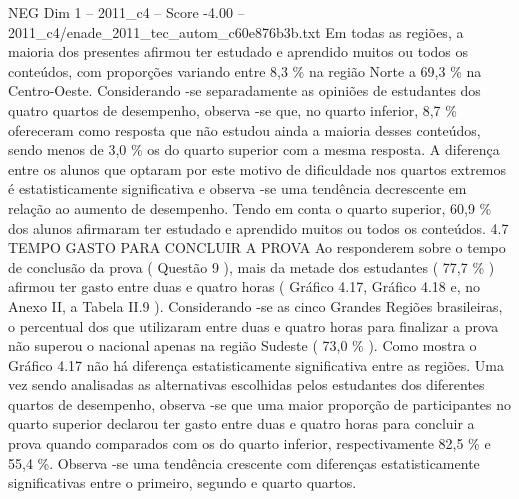 \begin{textsample}{NEG Dim 1 – 2011\_c4 – Score -4.00 – 2011\_c4/enade\_2011\_tec\_autom\_c60e876b3b.txt}
Em todas as regiões, a maioria dos presentes afirmou ter estudado e aprendido muitos ou todos os conteúdos, com proporções variando entre 8,3 \% na região Norte a 69,3 \% na Centro-Oeste.
Considerando -se separadamente as opiniões de estudantes dos quatro quartos de desempenho, observa -se que, no quarto inferior, 8,7 \% ofereceram como resposta que não estudou ainda a maioria desses conteúdos, sendo menos de 3,0 \% os do quarto superior com a mesma resposta.
A diferença entre os alunos que optaram por este motivo de dificuldade nos quartos extremos é estatisticamente significativa e observa -se uma tendência decrescente em relação ao aumento de desempenho.
Tendo em conta o quarto superior, 60,9 \% dos alunos afirmaram ter estudado e aprendido muitos ou todos os conteúdos. 4.7 TEMPO GASTO PARA CONCLUIR A PROVA Ao responderem sobre o tempo de conclusão da prova ( Questão 9 ), mais da metade dos estudantes ( 77,7 \% ) afirmou ter gasto entre duas e quatro horas ( Gráfico 4.17, Gráfico 4.18 e, no Anexo II, a Tabela II.9 ).
Considerando -se as cinco Grandes Regiões brasileiras, o percentual dos que utilizaram entre duas e quatro horas para finalizar a prova não superou o nacional apenas na região Sudeste ( 73,0 \% ).
Como mostra o Gráfico 4.17 não há diferença estatisticamente significativa entre as regiões.
Uma vez sendo analisadas as alternativas escolhidas pelos estudantes dos diferentes quartos de desempenho, observa -se que uma maior proporção de participantes no quarto superior declarou ter gasto entre duas e quatro horas para concluir a prova quando comparados com os do quarto inferior, respectivamente 82,5 \% e 55,4 \%.
Observa -se uma tendência crescente com diferenças estatisticamente significativas entre o primeiro, segundo e quarto quartos.

\end{textsample}

